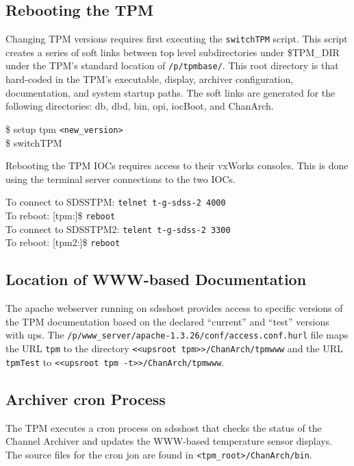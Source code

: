 \subsection{Rebooting the TPM}
 
Changing TPM versions requires first executing the
{\tt switchTPM} script. This script creates a series of soft links between
top level subdirectories under \$TPM\_DIR under the TPM's
standard location of {\tt /p/tpmbase/}. This root
directory is that hard-coded in the TPM's executable, 
display, archiver configuration, documentation, and
system startup paths. The soft links are generated for the
following directories: db, dbd, bin, opi, iocBoot, and ChanArch.

\$ setup tpm {\tt<new\_version>} \\
\$ switchTPM 

Rebooting the TPM IOCs requires access to their vxWorks consoles.
This is done using the terminal server connections to the two
IOCs. 

To connect to SDSSTPM: {\tt telnet t-g-sdss-2 4000} \\
To reboot: [tpm:]\$ {\tt reboot} \\

To connect to SDSSTPM2: {\tt telent t-g-sdss-2 3300} \\
To reboot: [tpm2:]\$ {\tt reboot} \\

\subsection{Location of WWW-based Documentation}

The apache webserver running on sdsshost provides access to
specific versions of the TPM documentation based on the
declared ``current'' and ``test'' versions with ups.
The {\tt /p/www\_server/apache-1.3.26/conf/access.conf.hurl}
file maps the URL {\tt tpm} to the directory
{\tt <<upsroot tpm>>/ChanArch/tpmwww} and the URL
{\tt tpmTest} to {\tt <<upsroot tpm -t>>/ChanArch/tpmwww}.


\subsection{Archiver cron Process}

The TPM executes a cron process on sdsshost that checks the
status of the Channel Archiver and updates the WWW-based
temperature sensor displays. The source files for the
cron jon are found in {\tt <tpm\_root>/ChanArch/bin}.

